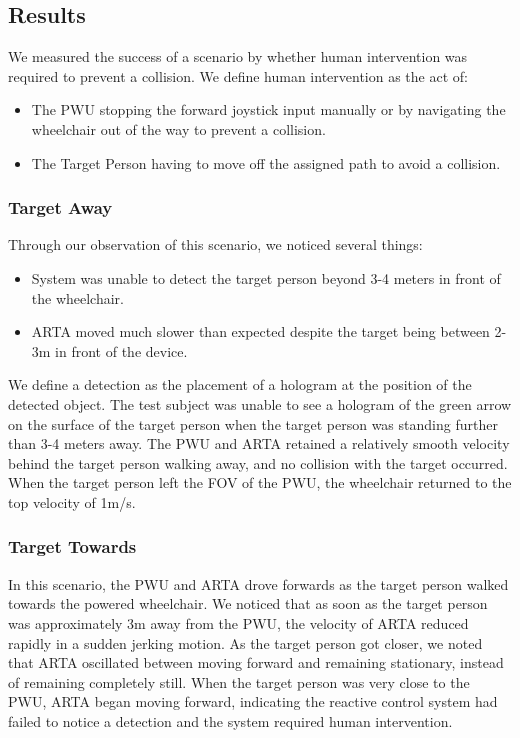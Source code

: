 \subsection{Results}
We measured the success of a scenario by whether human intervention was required to prevent a collision. We define human intervention as the act of:

\begin{itemize}
    \item The PWU stopping the forward joystick input manually or by navigating the wheelchair out of the way to prevent a collision.
    \item The Target Person having to move off the assigned path to avoid a collision.  
\end{itemize}

\subsubsection{Target Away}
Through our observation of this scenario, we noticed several things:

\begin{itemize}
    \item System was unable to detect the target person beyond 3-4 meters in front of the wheelchair.
    \item ARTA moved much slower than expected despite the target being between 2-3m in front of the device.
\end{itemize}

We define a detection as the placement of a hologram at the position of the detected object. The test subject was unable to see a hologram of the green arrow on the surface of the target person when the target person was standing further than 3-4 meters away. The PWU and ARTA retained a relatively smooth velocity behind the target person walking away, and no collision with the target occurred. When the target person left the FOV of the PWU, the wheelchair returned to the top velocity of 1m/s.

\subsubsection{Target Towards}
In this scenario, the PWU and ARTA drove forwards as the target person walked towards the powered wheelchair. We noticed that as soon as the target person was approximately 3m away from the PWU, the velocity of ARTA reduced rapidly in a sudden jerking motion. As the target person got closer, we noted that ARTA oscillated between moving forward and remaining stationary, instead of remaining completely still. When the target person was very close to the PWU, ARTA began moving forward, indicating the reactive control system had failed to notice a detection and the system required human intervention. 

